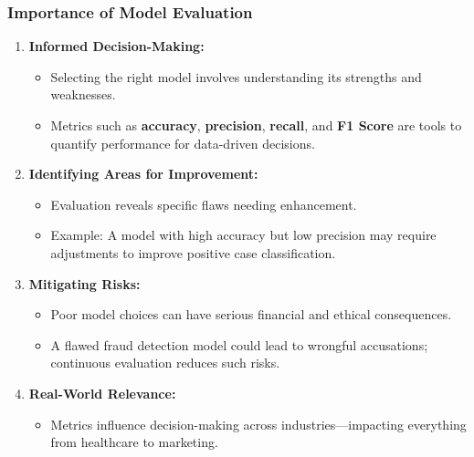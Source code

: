 \documentclass[aspectratio=169]{beamer}
\begin{document}
\begin{frame}[fragile]
    \frametitle{Importance of Model Evaluation}
    \begin{enumerate}
        \item \textbf{Informed Decision-Making:} 
            \begin{itemize}
                \item Selecting the right model involves understanding its strengths and weaknesses.
                \item Metrics such as \textbf{accuracy}, \textbf{precision}, \textbf{recall}, and \textbf{F1 Score} are tools to quantify performance for data-driven decisions.
            \end{itemize}
        
        \item \textbf{Identifying Areas for Improvement:} 
            \begin{itemize}
                \item Evaluation reveals specific flaws needing enhancement.
                \item Example: A model with high accuracy but low precision may require adjustments to improve positive case classification.
            \end{itemize}
        
        \item \textbf{Mitigating Risks:} 
            \begin{itemize}
                \item Poor model choices can have serious financial and ethical consequences.
                \item A flawed fraud detection model could lead to wrongful accusations; continuous evaluation reduces such risks.
            \end{itemize}
        
        \item \textbf{Real-World Relevance:} 
            \begin{itemize}
                \item Metrics influence decision-making across industries—impacting everything from healthcare to marketing.
            \end{itemize}
    \end{enumerate}
\end{frame}
\end{document}
